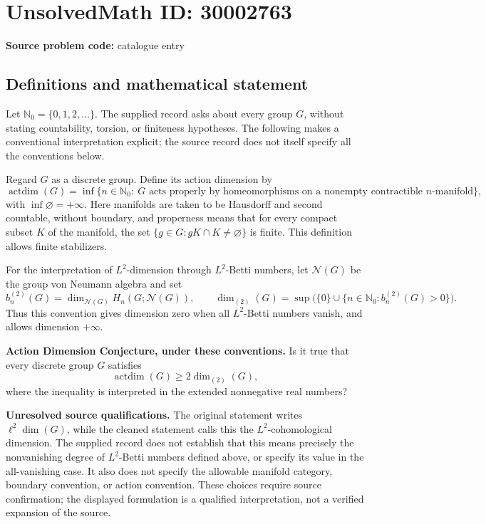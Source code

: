 \documentclass[11pt]{article}
\newcommand{\N}{\mathbb{N}}
\begin{document}
\section*{UnsolvedMath ID: 30002763}
\textbf{Source problem code:} catalogue entry
\subsection{Definitions and mathematical statement}
Let \(\N_0=\{0,1,2,\ldots\}\). The supplied record asks about every group \(G\), without stating countability, torsion, or finiteness hypotheses. The following makes a conventional interpretation explicit; the source record does not itself specify all the conventions below.

Regard \(G\) as a discrete group. Define its action dimension by
\[
\operatorname{actdim}(G)=\inf\bigl\{n\in\N_0:\ G\text{ acts properly by homeomorphisms on a nonempty contractible }n\text{-manifold}\bigr\},
\]
with \(\inf\varnothing=+\infty\). Here manifolds are taken to be Hausdorff and second countable, without boundary, and properness means that for every compact subset \(K\) of the manifold, the set \(\{g\in G:gK\cap K\ne\varnothing\}\) is finite. This definition allows finite stabilizers.

For the interpretation of \(L^2\)-dimension through \(L^2\)-Betti numbers, let \(\mathcal N(G)\) be the group von Neumann algebra and set
\[
b_n^{(2)}(G)=\dim_{\mathcal N(G)}H_n(G;\mathcal N(G)),\qquad
\dim_{(2)}(G)=\sup\bigl(\{0\}\cup\{n\in\N_0:b_n^{(2)}(G)>0\}\bigr).
\]
Thus this convention gives dimension zero when all \(L^2\)-Betti numbers vanish, and allows dimension \(+\infty\).

\textbf{Action Dimension Conjecture, under these conventions.} Is it true that every discrete group \(G\) satisfies
\[
\operatorname{actdim}(G)\geq 2\dim_{(2)}(G),
\]
where the inequality is interpreted in the extended nonnegative real numbers?

\textbf{Unresolved source qualifications.} The original statement writes \(\ell^2\operatorname{dim}(G)\), while the cleaned statement calls this the \(L^2\)-cohomological dimension. The supplied record does not establish that this means precisely the nonvanishing degree of \(L^2\)-Betti numbers defined above, or specify its value in the all-vanishing case. It also does not specify the allowable manifold category, boundary convention, or action convention. These choices require source confirmation; the displayed formulation is a qualified interpretation, not a verified expansion of the source.
\end{document}
